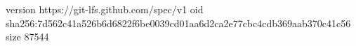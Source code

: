 version https://git-lfs.github.com/spec/v1
oid sha256:7d562c41a526b6d6822f6be0039cd01aa6d2ca2e77cbc4cdb369aab370c41c56
size 87544
